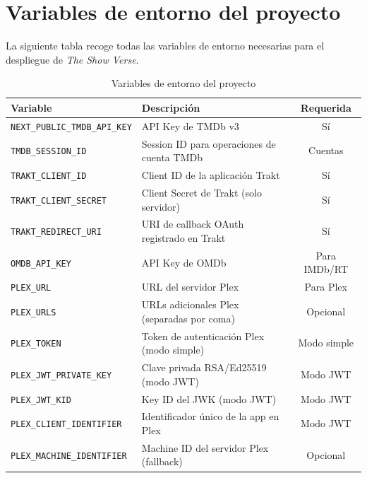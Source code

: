 \section*{Variables de entorno del proyecto}

La siguiente tabla recoge todas las variables de entorno necesarias para el despliegue de \textit{The Show Verse}.

\begin{table}[!htbp]
\begin{center}
\begin{tabular}{| l | l | c |}
\hline
\textbf{Variable} & \textbf{Descripción} & \textbf{Requerida} \\
\hline
\hline
\texttt{NEXT\_PUBLIC\_TMDB\_API\_KEY} & API Key de TMDb v3 & Sí \\
\hline
\texttt{TMDB\_SESSION\_ID} & Session ID para operaciones de cuenta TMDb & Cuentas \\
\hline
\texttt{TRAKT\_CLIENT\_ID} & Client ID de la aplicación Trakt & Sí \\
\hline
\texttt{TRAKT\_CLIENT\_SECRET} & Client Secret de Trakt (solo servidor) & Sí \\
\hline
\texttt{TRAKT\_REDIRECT\_URI} & URI de callback OAuth registrado en Trakt & Sí \\
\hline
\texttt{OMDB\_API\_KEY} & API Key de OMDb & Para IMDb/RT \\
\hline
\texttt{PLEX\_URL} & URL del servidor Plex & Para Plex \\
\hline
\texttt{PLEX\_URLS} & URLs adicionales Plex (separadas por coma) & Opcional \\
\hline
\texttt{PLEX\_TOKEN} & Token de autenticación Plex (modo simple) & Modo simple \\
\hline
\texttt{PLEX\_JWT\_PRIVATE\_KEY} & Clave privada RSA/Ed25519 (modo JWT) & Modo JWT \\
\hline
\texttt{PLEX\_JWT\_KID} & Key ID del JWK (modo JWT) & Modo JWT \\
\hline
\texttt{PLEX\_CLIENT\_IDENTIFIER} & Identificador único de la app en Plex & Modo JWT \\
\hline
\texttt{PLEX\_MACHINE\_IDENTIFIER} & Machine ID del servidor Plex (fallback) & Opcional \\
\hline
\end{tabular}
\caption{Variables de entorno del proyecto}
\label{tab:envvars}
\end{center}
\end{table}

